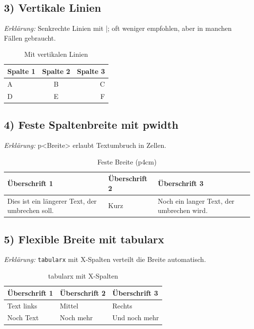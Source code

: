 \documentclass[twoside]{scrreprt}
\begin{document}
\subsection*{3) Vertikale Linien}
	\textit{Erklärung:} Senkrechte Linien mit |; oft weniger empfohlen, aber in manchen Fällen gebraucht.
\begin{table}[h!]
	\centering
	\caption{Mit vertikalen Linien}
	\begin{tabular}{|l|c|r|}
		\hline
		Spalte 1 & Spalte 2 & Spalte 3 \\
		\hline
		A & B & C \\
		D & E & F \\
		\hline
	\end{tabular}
\end{table}

\subsection*{4) Feste Spaltenbreite mit p{width}}
	\textit{Erklärung:} p{<Breite>} erlaubt Textumbruch in Zellen.
\begin{table}[h!]
	\centering
	\caption{Feste Breite (p{4cm})}
	\begin{tabular}{p{4cm}p{4cm}p{4cm}}

		 Überschrift 1 &  Überschrift 2 &  Überschrift 3 \\
		\midrule
		Dies ist ein längerer Text, der umbrechen soll. & Kurz & Noch ein langer Text, der umbrechen wird. \\
		\bottomrule
	\end{tabular}
\end{table}

\subsection*{5) Flexible Breite mit tabularx}
	\textit{Erklärung:} \texttt{tabularx} mit X-Spalten verteilt die Breite automatisch.
\begin{table}[h!]
	\centering
	\caption{tabularx mit X-Spalten}
	\begin{tabularx}{\textwidth}{X X X}
		
		Überschrift 1 & Überschrift 2 & Überschrift 3 \\
		\midrule
		Text links & Mittel & Rechts \\
		Noch Text & Noch mehr & Und noch mehr \\
		\bottomrule
	\end{tabularx}
\end{table}
\end{document}
